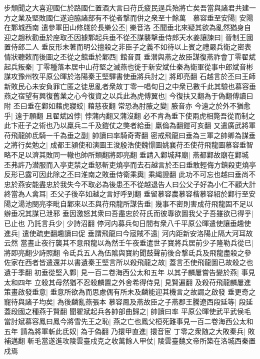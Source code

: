 步頹聞之大喜迎國仁於路國仁置酒大言曰苻氏疲民逞兵殆將亡矣吾當與諸君共建一方之業及堅敗國仁遂迫脇諸部有不從者撃而併之衆至十餘萬　慕容垂至安陽|{
	安陽在鄴城西南}
遣參軍田山修牋於長樂公丕|{
	樂音洛}
丕聞垂北來疑其欲為亂然猶身自迎之趙秋勸垂於座取丕因據鄴起兵垂不從丕謀襲撃垂侍郎天水姜讓諫曰|{
	晉制王國置侍郎二人}
垂反形未著而明公擅殺之非臣子之義不如待以上賓之禮嚴兵衛之密表情狀聽敕而後圖之丕從之館垂於鄴西|{
	館音貫}
垂潜與燕之故臣謀復燕祚會丁零翟斌起兵叛秦|{
	丁零種落本居中山苻堅之滅燕也徙于新安斌仕秦為衛軍從事中郎斌音彬}
謀攻豫州牧平原公暉於洛陽秦王堅驛書使垂將兵討之|{
	將即亮翻}
石越言於丕曰王師新敗民心未安負罪亡匿之徒思亂者衆故丁零一唱旬日之中衆已數千此其驗也慕容垂燕之宿望有興復舊業之心今復資之以兵此為虎傅翼也|{
	今復扶又翻為于偽翻傅讀曰附}
丕曰垂在鄴如藉虎寢蛟|{
	藉慈夜翻}
常恐為肘腋之變|{
	腋音亦}
今遠之於外不猶愈乎|{
	遠于願翻}
且翟斌凶悖|{
	悖蒲内翻又蒲沒翻}
必不肯為垂下使兩虎相斃吾從而制之此卞莊子之術也乃以羸兵二千及鎧仗之獘者給垂|{
	羸倫為翻鎧可亥翻}
又遣廣武將軍苻飛龍帥氐騎一千為垂之副|{
	帥讀曰率騎奇寄翻}
密戒飛龍曰垂為三軍之帥卿為謀垂之將行矣勉之|{
	成都王潁使和演圖王浚殷浩使魏憬圖姚襄苻丕使苻飛龍圖慕容垂智略不足以濟其敗同一轍也帥所類翻將即亮翻}
垂請入鄴城拜廟|{
	燕都鄴故廟在鄴城}
丕弗許乃潜服而入亭吏禁之垂怒斬吏燒亭而去石越言於丕曰垂敢輕侮方鎮殺吏燒亭反形已露可因此除之丕曰淮南之敗垂侍衛乘輿|{
	乘䋲證翻}
此功不可忘也越曰垂尚不忠於燕安能盡忠於我失今不取必為後患丕不從越退告人曰公父子好為小仁不顧大計終當為人禽耳|{
	丕父子後卒如越之言好呼到翻}
垂留慕容農慕容楷慕容紹於鄴行至安陽之湯池閔亮李毗自鄴來以丕與苻飛龍所謀告垂|{
	幾事不密則害成苻飛龍固不足以辦垂况其謀已泄邪}
垂因激怒其衆曰吾盡忠於苻氏而彼專欲圖我父子吾雖欲已得乎|{
	已止也}
乃託言兵少|{
	少詩沼翻}
停河内募兵旬日間有衆八千平原公暉遣使讓垂趣使進兵|{
	遣使疏吏翻趣讀曰促}
垂謂飛龍曰今宼賊不遠|{
	河内距新安洛陽止隔大河耳故云然}
當晝止夜行襲其不意飛龍以為然壬午夜垂遣世子寶將兵居前少子隆勒兵從已|{
	將即亮翻少詩照翻}
令氐兵五人為伍隂與寶約聞鼓聲前後合撃氐兵及飛龍盡殺之參佐家在西者皆遣還并以書遺秦王堅言所以殺飛龍之故|{
	蓋言丕使飛龍圖已故殺之也遺于季翻}
初垂從堅入鄴|{
	見一百二卷海西公太和五年}
以其子麟屢嘗告變於燕|{
	事見太和四年}
立殺其母然猶不忍殺麟置之外舍希得侍見|{
	見賢遍翻}
及殺苻飛龍麟屢進策畫啟發垂意|{
	垂意所欲為而思慮偶有所未及麟能迎其機言之故謂之啟發}
垂更奇之寵待與諸子均矣|{
	為後麟亂燕張本}
慕容鳳及燕故臣之子燕郡王騰遼西段延等|{
	段延蓋段國之種燕于賢翻}
聞翟斌起兵各帥部曲歸之|{
	帥讀曰率}
平原公暉使武平武侯毛當討斌慕容鳳曰鳳今將雪先王之恥|{
	燕之亡也鳳父桓死難事見一百二卷海西公太和五年}
請為將軍斬此氐奴|{
	為于偽翻}
乃擐甲直進|{
	擐音宦}
丁零之衆随之大敗秦兵|{
	敗補邁翻}
斬毛當遂進攻陵雲臺戍克之收萬餘人甲仗|{
	陵雲臺魏文帝所築在洛城西秦置戍焉}
